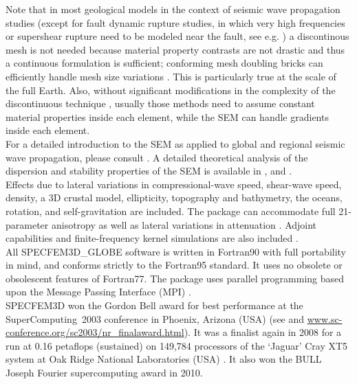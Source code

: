 \documentclass[oneside,english]{book}
\begin{document}
Note that in most geological models in the context of seismic wave propagation studies
(except for fault dynamic rupture studies, in which very high frequencies or supershear rupture need to be modeled near the fault, see e.g. \cite{BeGlCrViPi07,BeGlCrVi09,PuAmKa09,TaCrEtViBeSa10})
a discontinous mesh is not needed because material property contrasts are not drastic and thus a continuous formulation is sufficient;
conforming mesh doubling bricks can efficiently handle mesh size variations \citep{KoTr02a,KoLiTrSuStSh04,LeChLiKoHuTr08,LeChKoHuTr09,LeKoHuTr09}.
This is particularly true at the scale of the full Earth.
Also, without significant modifications in the complexity of the
discontinuous technique \citep{CaKaBr10,SmCoObOvSch10},
usually those methods need to assume constant material properties inside
each element, while the SEM can handle gradients inside each element.\\

For a detailed introduction to the SEM as applied to
global and regional seismic wave propagation, please consult \citet{KoVi98,KoTr99,Ch00,KoTr02a,KoTr02b,KoRiTr02,ChCaVi03,CaChViMo03,ChVa04,ChKoViCaVaFe07,TrKoLi08}.
A detailed theoretical analysis of the dispersion
and stability properties of the SEM is available in \citet{Coh02}, \citet{DeSe07} and \citet{SeOl07}.\\

Effects due to lateral variations in compressional-wave
speed, shear-wave speed, density, a 3D crustal model, ellipticity,
topography and bathymetry, the oceans, rotation, and self-gravitation are included.
The package can accommodate full 21-parameter anisotropy \citep{ChTr07}
as well as lateral variations in attenuation \citep{SavWiTr05}. Adjoint
capabilities and finite-frequency kernel simulations are also included
\citep{LiTr06,TrKoLi08,LiTr08,FiIgBuKe09,ViOp09}.\\

All SPECFEM3D\_GLOBE software is written in Fortran90 with full portability
in mind, and conforms strictly to the Fortran95 standard. It uses
no obsolete or obsolescent features of Fortran77. The package uses
parallel programming based upon the Message Passing Interface (MPI)
\citep{GrLuSk94,Pac97}.\\

SPECFEM3D won the Gordon Bell award for best performance at the SuperComputing~2003
conference in Phoenix, Arizona (USA) (see \cite{KoTsChTr03}
and \url{www.sc-conference.org/sc2003/nr_finalaward.html}).
It was a finalist again in 2008 for a run at 0.16 petaflops (sustained) on 149,784 processors of the `Jaguar' Cray XT5 system at Oak Ridge National Laboratories (USA) \citep{CaKoLaTiMiLeSnTr08}.
It also won the BULL Joseph Fourier supercomputing award in 2010.\\
\end{document}
